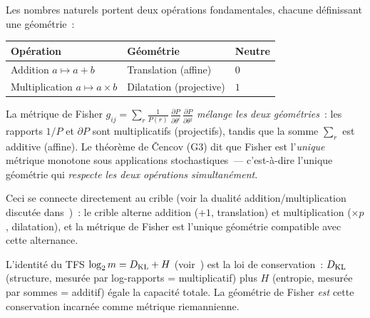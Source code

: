 \documentclass[12pt,a4paper]{article}
\begin{document}
\begin{remarque}
\label{rem:two_geometries}
Les nombres naturels portent deux opérations fondamentales, chacune
définissant une géométrie~:
\begin{center}
\begin{tabular}{lll}
\toprule
\textbf{Opération} & \textbf{Géométrie} & \textbf{Neutre} \\
\midrule
Addition $a \mapsto a + b$ & Translation (affine) & $0$ \\
Multiplication $a \mapsto a \times b$ & Dilatation (projective) & $1$ \\
\bottomrule
\end{tabular}
\end{center}

La métrique de Fisher
$g_{ij} = \sum_r \frac{1}{P(r)}\,
\frac{\partial P}{\partial\theta^i}\,
\frac{\partial P}{\partial\theta^j}$
\emph{mélange les deux géométries}~: les rapports $1/P$ et
$\partial P$ sont multiplicatifs (projectifs), tandis que la somme
$\sum_r$ est additive (affine). Le théorème de \v{C}encov (G3) dit que
Fisher est l'\emph{unique} métrique monotone sous applications
stochastiques~--- c'est-à-dire l'unique géométrie qui
\emph{respecte les deux opérations simultanément}.

Ceci se connecte directement au crible (voir la dualité
addition/multiplication discutée dans~\cite{companion_M1})~: le crible
alterne addition ($+1$, translation) et multiplication ($\times p$,
dilatation), et la métrique de Fisher est l'unique géométrie
compatible avec cette alternance.

L'identité du TFS $\log_2 m = D_{\mathrm{KL}} + H$ (voir~\cite{companion_M1}) est
la loi de conservation~: $D_{\mathrm{KL}}$ (structure, mesurée par log-rapports =
multiplicatif) plus $H$ (entropie, mesurée par sommes = additif) égale
la capacité totale. La géométrie de Fisher \emph{est} cette
conservation incarnée comme métrique riemannienne.
\end{remarque}
\end{document}
